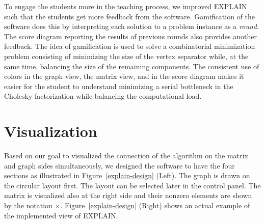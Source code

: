 \documentclass[11pt, twoside,a4paper]{book}
\newcommand{\figref}[1]{Figure~\protect\ref{#1}}
\begin{document}
To engage the students more in the teaching process, we improved EXPLAIN such that the students get
more feedback from the software. Gamification of the software does this by interpreting each
solution to a problem instance as a \textit{round}. The score diagram reporting the results of previous
rounds also provides another feedback. The idea of gamification is used to solve a combinatorial
minimization problem consisting of minimizing the size of the vertex separator while, at the same
time, balancing the size of the remaining components. The consistent use of colors in the graph
view, the matrix view, and in the score diagram makes it easier for the student to understand
minimizing a serial bottleneck in the Cholesky factorization while balancing the computational
load.
\section{Visualization}
\label{s.vis}
Based on our goal to visualized the connection of the algorithm on the matrix and graph sides simultaneously,
we designed the software to have the four sections as illustrated in \figref{explain-design} (Left).
The graph is drawn on the circular layout first. The layout can be selected later
in the control panel. The matrix is visualized also at the right side and
their nonzero elements are shown by the notation $\times$.
\figref{explain-design} (Right) shows an actual example of the implemented view of
\mbox{EXPLAIN}.
\end{document}
